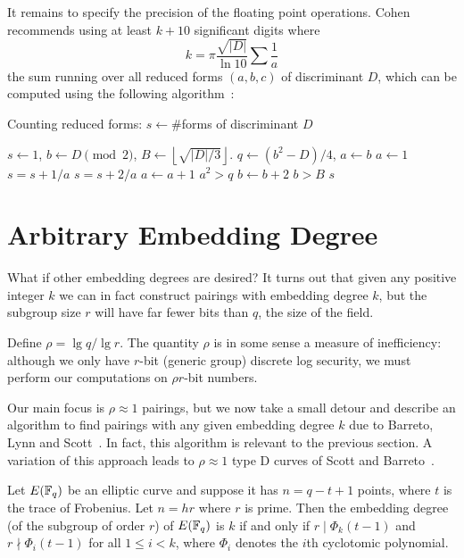 It remains to specify the precision of the floating point operations.
Cohen recommends using at least $k + 10$ significant digits where
\[ k = \pi \frac{\sqrt{|D|}} {\ln 10} \sum \frac{1}{a} \]
the sum running over all reduced forms $(a,b,c)$ of discriminant $D$,
which can be computed using the following algorithm~\cite[Algorithm 5.3.5]{1993-cohen}:

\begin{algorithm}
\caption {Counting reduced forms: $s \gets \#$forms of discriminant $D$}
\begin{algorithmic}[1]
\STATE $s\gets 1$, $b\gets D \pmod 2$, $B\gets \left\lfloor \sqrt{|D|/3}
\right\rfloor$.
\REPEAT
    \REPEAT
	\STATE $q\gets (b^2 - D)/4$, $a\gets b$
	    \STATE $a\gets 1$
		\STATE $s=s+1/a$
	    \ELSE
		\STATE $s=s+2/a$
	    \ENDIF
	\ENDIF
	\STATE $a\gets a+1$
    \UNTIL $a^2>q$
    \STATE $b\gets b+2$
\UNTIL $b>B$
\RETURN $s$
\end{algorithmic}
\end{algorithm}

\section {\label{sec:balscurves}Arbitrary Embedding Degree}

What if other embedding degrees are desired? It turns out that given any
positive integer $k$ we can in fact construct pairings with embedding
degree $k$, but the subgroup size $r$ will have far fewer bits than $q$,
the size of the field.

Define $\rho = \lg q / \lg r$. The quantity $\rho$ is in some sense
a measure of inefficiency: although we only have $r$-bit (generic group)
discrete log security, we must perform our computations on $\rho r$-bit numbers.

Our main focus is $\rho \approx 1$ pairings, but we now take a small detour
and describe an algorithm to find
pairings with any given embedding degree $k$ due to Barreto, Lynn and Scott~\cite{bals}.
In fact, this algorithm is relevant to the previous section.
A variation of this approach leads to $\rho \approx 1$ type D
curves of Scott and Barreto~\cite{moremnt}.

\begin{lemma}
Let $E(\mathbb{F}_q)$ be an elliptic curve and suppose it has
$n = q - t + 1$ points, where $t$ is the trace of Frobenius.
Let $n = h r$ where $r$ is prime.
Then the embedding degree (of the subgroup of order $r$) of $E(\mathbb{F}_q)$ is $k$
if and only if
$r \mid \Phi_k(t-1)$ and $r \nmid \Phi_i(t-1)$ for all $1 \le i < k$,
where $\Phi_i$ denotes the $i$th cyclotomic polynomial.
\end{lemma}

